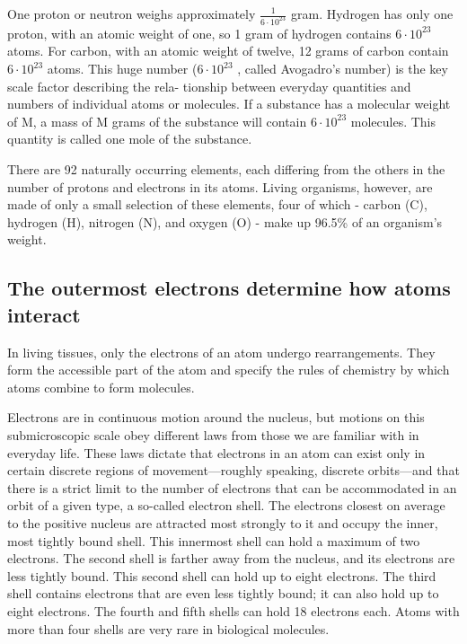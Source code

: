 One proton or neutron weighs approximately $\frac{1}{6 \cdot 10^23}$ gram. Hydrogen has
only one proton, with an atomic weight of one, so 1 gram of hydrogen
contains $6 \cdot 10^23$ atoms. For carbon, with an atomic weight of twelve,
12 grams of carbon contain $6 \cdot 10^23$ atoms. This huge number ($6 \cdot 10^23$ ,
called Avogadro’s number) is the key scale factor describing the rela-
tionship between everyday quantities and numbers of individual atoms
or molecules. If a substance has a molecular weight of M, a mass of M
grams of the substance will contain $6 \cdot 10^23$ molecules. This quantity is
called one mole of the substance.

There are 92 naturally occurring elements, each differing from the others
in the number of protons and electrons in its atoms. Living organisms,
however, are made of only a small selection of these elements, four of
which - carbon (C), hydrogen (H), nitrogen (N), and oxygen (O) - make up
96.5\% of an organism’s weight.


\subsection{The outermost electrons determine how atoms interact}

In living tissues, only the electrons of an atom undergo rearrangements.
They form the accessible part of the atom and specify the rules of
chemistry by which atoms combine to form molecules.

Electrons are in continuous motion around the nucleus, but motions on
this submicroscopic scale obey different laws from those we are familiar
with in everyday life. These laws dictate that electrons in an atom can exist
only in certain discrete regions of movement—roughly speaking, discrete
orbits—and that there is a strict limit to the number of electrons that can
be accommodated in an orbit of a given type, a so-called electron shell.
The electrons closest on average to the positive nucleus are attracted
most strongly to it and occupy the inner, most tightly bound shell. This
innermost shell can hold a maximum of two electrons. The second shell
is farther away from the nucleus, and its electrons are less tightly bound.
This second shell can hold up to eight electrons. The third shell contains
electrons that are even less tightly bound; it can also hold up to eight
electrons. The fourth and fifth shells can hold 18 electrons each. Atoms
with more than four shells are very rare in biological molecules.

